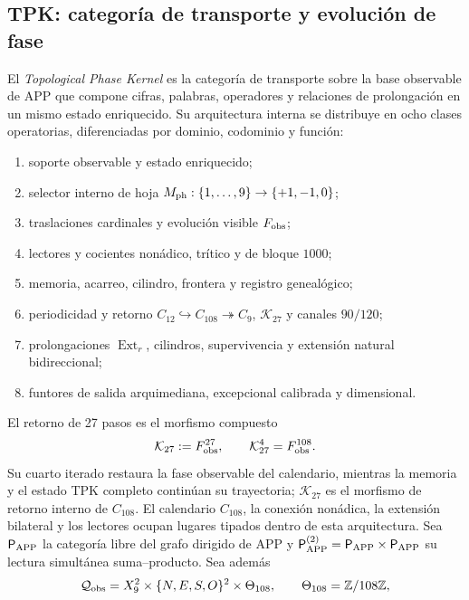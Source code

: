 \subsection{TPK: categoría de transporte y evolución de fase}

El \emph{Topological Phase Kernel} es la categoría de transporte sobre la
base observable de APP que compone cifras, palabras, operadores y relaciones
de prolongación en un mismo estado enriquecido. Su arquitectura interna se distribuye en
ocho clases operatorias, diferenciadas por dominio, codominio y función:
\begin{enumerate}[label=\textup{(\roman*)},leftmargin=2.25em]
\item soporte observable y estado enriquecido;
\item selector interno de hoja \(M_{\rm ph}:\{1,\ldots,9\}\to\{+1,-1,0\}\);
\item traslaciones cardinales y evolución visible \(F_{\rm obs}\);
\item lectores y cocientes nonádico, trítico y de bloque \(1000\);
\item memoria, acarreo, cilindro, frontera y registro genealógico;
\item periodicidad y retorno
\(C_{12}\hookrightarrow C_{108}\twoheadrightarrow C_9\),
\(\mathcal K_{27}\) y canales \(90/120\);
\item prolongaciones \(\operatorname{Ext}_r\), cilindros, supervivencia y
extensión natural bidireccional;
\item funtores de salida arquimediana, excepcional calibrada y dimensional.
\end{enumerate}
El retorno de 27 pasos es el morfismo compuesto
\begin{equation}
\mathcal K_{27}:=F_{\rm obs}^{27},
\qquad \mathcal K_{27}^{4}=F_{\rm obs}^{108}.
\label{p12-83-c3-s1:eq:tpk-kernel-27}
\end{equation}
Su cuarto iterado restaura la fase observable del calendario, mientras la
memoria y el estado TPK completo continúan su trayectoria;
\(\mathcal K_{27}\) es el morfismo de retorno interno de \(C_{108}\).
El calendario \(C_{108}\), la conexión nonádica, la extensión bilateral y
los lectores ocupan lugares tipados dentro de esta arquitectura. Sea
\(\mathsf P_{\rm APP}\) la categoría
libre del grafo dirigido de APP y
\(\mathsf P_{\rm APP}^{(2)}=\mathsf P_{\rm APP}\times
\mathsf P_{\rm APP}\) su lectura simultánea suma--producto. Sea además
\[
\mathcal Q_{\rm obs}
=X_9^2\times\{N,E,S,O\}^2\times\Theta_{108},
\qquad \Theta_{108}=\mathbb Z/108\mathbb Z,
\]

